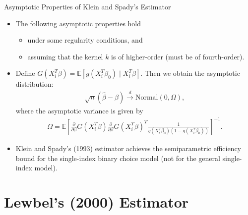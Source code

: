 \documentclass[xcolor=svgnames,dvipdfmx,cjk]{beamer}
\theoremstyle{example}
\def\E{\mathbb{E}}
\def\darrow{\xrightarrow{d}}
\begin{document}
\begin{frame}{Asymptotic Properties of Klein and Spady's Estimator}
\begin{itemize}
  \item The following asymptotic properties hold 
        \begin{itemize}
          \item under some regularity conditions, and
          \item assuming that the kernel $k$ is of higher-order (must be of fourth-order).
        \end{itemize}
  \item Define $G(X_i^T \beta) = \E[g(X_i^T\beta_0)\mid X_i^T\beta]$. 
        Then we obtain the asymptotic distribution:
        \begin{align*}
          \sqrt{n}(\hat{\beta} - \beta) \darrow \text{Normal}(0, \Omega),
        \end{align*}
        where the asymptotic variance is given by 
        \begin{align*}
          \Omega = \E \left[ 
            \frac{\partial}{\partial\beta}G(X_i^T\beta)
            \frac{\partial}{\partial\beta}G(X_i^T\beta)^T
            \frac{1}{g(X_i^T\beta_0)(1-g(X_i^T\beta_0))}
          \right]^{-1}.
        \end{align*}
  \item Klein and Spady's (1993) estimator achieves \alert{the semiparametric efficiency bound for the single-index binary choice model} (not for the general single-index model).
\end{itemize}
\end{frame}
 
  
\section{Lewbel's (2000) Estimator}
  
  
  
  
  
  















  
  
\end{document}
